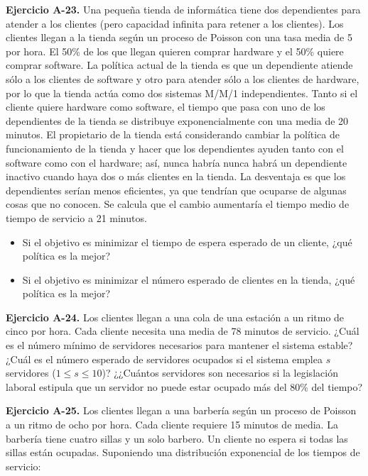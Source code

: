\documentclass[
]{book}
\providecommand{\tightlist}{%
  \setlength{\itemsep}{0pt}\setlength{\parskip}{0pt}}
\theoremstyle{definition}
\theoremstyle{definition}
\theoremstyle{definition}
\theoremstyle{definition}
\theoremstyle{remark}
\begin{document}
\textbf{Ejercicio A-23.} Una pequeña tienda de informática tiene dos dependientes para atender a los clientes (pero capacidad infinita para retener a los clientes). Los clientes llegan a la tienda según un proceso de Poisson con una tasa media de 5 por hora. El 50\% de los que llegan quieren comprar hardware y el 50\% quiere comprar software. La política actual de la tienda es que un dependiente atiende sólo a los clientes de software y otro para atender sólo a los clientes de hardware, por lo que la tienda actúa como dos sistemas M/M/1 independientes. Tanto si el cliente quiere hardware como software, el tiempo que pasa con uno de los dependientes de la tienda se distribuye exponencialmente con una media de 20 minutos. El propietario de la tienda está considerando cambiar la política de funcionamiento de la tienda y hacer que los dependientes ayuden tanto con el software como con el hardware; así, nunca habría nunca habrá un dependiente inactivo cuando haya dos o más clientes en la tienda. La desventaja es que los dependientes serían menos eficientes, ya que tendrían que ocuparse de algunas cosas que no conocen. Se calcula que el cambio aumentaría el tiempo medio de tiempo de servicio a 21 minutos.

\begin{itemize}
\tightlist
\item
  Si el objetivo es minimizar el tiempo de espera esperado de un cliente, ¿qué política es la mejor?
\item
  Si el objetivo es minimizar el número esperado de clientes en la tienda, ¿qué política es la mejor?
\end{itemize}

\textbf{Ejercicio A-24.} Los clientes llegan a una cola de una estación a un ritmo de cinco por hora. Cada cliente necesita una media de 78 minutos de servicio. ¿Cuál es el número mínimo de servidores necesarios para mantener el sistema estable? ¿Cuál es el número esperado de servidores ocupados si el sistema emplea \(s\) servidores (\(1 \leq s \leq 10\))? ¿¿Cuántos servidores son necesarios si la legislación laboral estipula que un servidor no puede estar ocupado más del 80\% del tiempo?

\textbf{Ejercicio A-25.} Los clientes llegan a una barbería según un proceso de Poisson a un ritmo de ocho por hora. Cada cliente requiere 15 minutos de media. La barbería tiene cuatro sillas y un solo barbero. Un cliente no espera si todas las sillas están ocupadas. Suponiendo una distribución exponencial de los tiempos de servicio:
\end{document}

